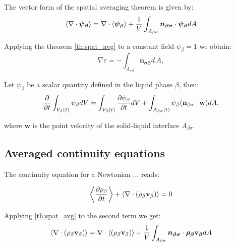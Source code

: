 \begin{corollary}
	The vector form of the spatial averaging theorem is given by:
	\begin{equation}
	{\left< \nabla \cdot \boldsymbol{\psi_{\beta}} \right>} = \nabla \cdot {\left<   \boldsymbol{\psi_{\beta}} \right>} + \dfrac{1}{V} \int_{A_{\beta \sigma}} \boldsymbol{n_{\beta \sigma}} \cdot \boldsymbol{\psi_{\beta}} dA
			\label{th:vec_spat_avg}
	\end{equation}
\end{corollary}

\begin{corollary}
	Applying the theorem \ref{th:spat_avg} to a constant field $\psi_{\beta} = 1$ we obtain:
	\begin{equation}
		\nabla \varepsilon = - \int_{A_{\sigma \beta}} \mathbf{n_{\sigma \beta}} d \, A,
	\end{equation}
\end{corollary}


\begin{theorem}
	Let $\psi_{\beta}$ be a scalar quantity defined in the liquid phase $\beta$, then:
	\begin{equation}
	\dfrac{\partial}{\partial t} \int_{V_\beta(t)} \psi_{\beta} dV =  \int_{V_\beta(t)} \dfrac{\partial \psi_{\beta}}{\partial t} dV + \int_{A_{\beta \sigma}(t)} \psi_{\beta} (\mathbf{n}_{\beta \sigma} \cdot \mathbf{w} ) dA,
	\label{th:transport}
	\end{equation}
	
	where $\mathbf{w}$ is the point velocity of the solid-liquid interface $A_{\beta \sigma}$.
\end{theorem}


\subsection{Averaged continuity equations}

The continuity equation for a Newtonian ... reads:

\begin{equation}
{\left< \dfrac{\partial \rho_{\beta}}{\partial t} \right>} + {\left< \nabla \cdot (\rho_{\beta}\textbf{v}_{\beta}) \right>}   = 0
\label{eq:superf_avg_cont}
\end{equation}

Applying \ref{th:spat_avg} to the second term we get:
\begin{equation}
 {\left< \nabla \cdot (\rho_{\beta}\textbf{v}_{\beta}) \right>} = \nabla \cdot {\left<  (\rho_{\beta}\textbf{v}_{\beta}) \right>} + \dfrac{1}{V} \int_{A_{\beta \sigma}} \boldsymbol{n_{\beta \sigma}} \cdot \boldsymbol{\rho_{\beta} \textbf{v}_{\beta}} dA
 \label{eq:avg_1}
\end{equation}

